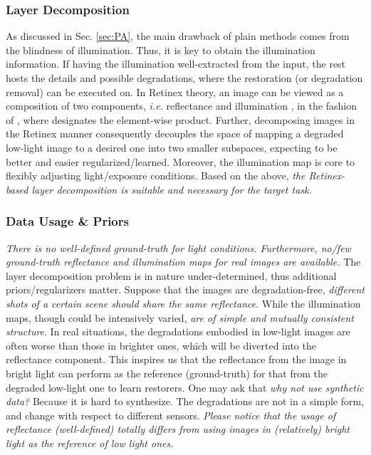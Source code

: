 \documentclass[journal,10pt,compsoc]{IEEEtran}
\begin{document}
\subsubsection{Layer Decomposition} 
As discussed in Sec. \ref{sec:PA}, the main drawback of plain methods comes from the blindness of illumination. Thus, it is key to obtain the illumination information. If having the illumination well-extracted from the input, the rest hosts the details and possible degradations, where the restoration (or degradation removal) can be executed on. In Retinex theory, an image  can be viewed as a composition of two components, {\it i.e.} reflectance  and illumination , in the fashion of , where  designates the element-wise product. Further, decomposing images in the Retinex manner consequently decouples the space of mapping a degraded low-light image to a desired one into two smaller subspaces, expecting to be better and easier regularized/learned. Moreover, the illumination map is core to flexibly adjusting light/exposure conditions. Based on the above, {\it the Retinex-based layer decomposition is suitable and necessary for the target task.}  



\subsubsection{Data Usage \& Priors} 
{\it There is no well-defined ground-truth for light conditions. Furthermore, no/few ground-truth reflectance and illumination maps for real images are available.} The layer decomposition problem is in nature under-determined, thus additional priors/regularizers matter. Suppose that the images are degradation-free, {\it different shots of a certain scene should share the same reflectance}. While the illumination maps, though could be intensively varied, {\it are of simple and mutually consistent structure}. In real situations, the degradations embodied in low-light images are often worse than those in brighter ones, which will be diverted into the reflectance component. This inspires us that the reflectance from the image in bright light can perform as the reference (ground-truth) for that from the degraded low-light one to learn restorers. One may ask that {\it why not use synthetic data?} Because it is hard to synthesize. The degradations are not in a simple form, and change with respect to different sensors. {\it Please notice that the usage of reflectance (well-defined) totally differs from using images in (relatively) bright light as the reference of low light ones.}
\end{document}
